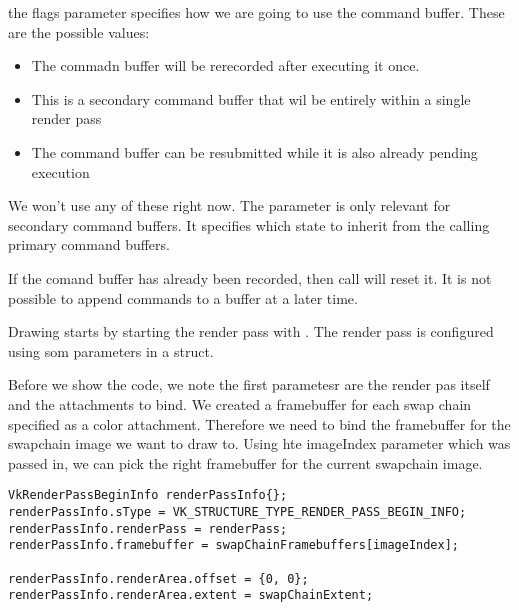 \par the flags parameter specifies how we are going to use the command buffer. These are the possible values:

\begin{itemize}
    \item {} The commadn buffer will be rerecorded after executing it once.
    \item {} This is a secondary command buffer that wil be entirely within a single render pass
    \item {} The command buffer can be resubmitted while it is also already pending execution
\end{itemize}

\par We won't use any of these right now. The  parameter is only relevant for secondary command buffers. It specifies which state to inherit from the calling primary command buffers.

\par If the comand buffer has already been recorded, then call  will reset it. It is not possible to append commands to a buffer at a later time. 

\par Drawing starts by starting the render pass with . The render pass is configured using som parameters in a  struct.

\par Before we show the code, we note the first parametesr are the render pas itself and the attachments to bind. We created a framebuffer for each swap chain specified as a color attachment. Therefore we need to bind the framebuffer for the swapchain image we want to draw to. Using hte imageIndex parameter which was passed in, we can pick the right framebuffer for the current swapchain image.

\begin{center}
\begin{minipage}{0.95\linewidth}
\begin{lstlisting}
VkRenderPassBeginInfo renderPassInfo{};
renderPassInfo.sType = VK_STRUCTURE_TYPE_RENDER_PASS_BEGIN_INFO;
renderPassInfo.renderPass = renderPass;
renderPassInfo.framebuffer = swapChainFramebuffers[imageIndex];

renderPassInfo.renderArea.offset = {0, 0};
renderPassInfo.renderArea.extent = swapChainExtent;
\end{lstlisting}
\end{minipage}
\end{center}

